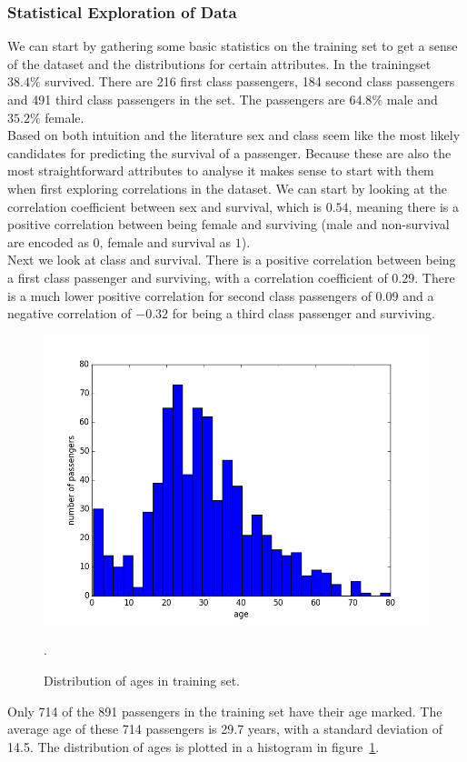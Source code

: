 \documentclass[english, a4paper]{article}
\begin{document}
\subsubsection{Statistical Exploration of Data}
We can start by gathering some basic statistics on the training set to get a sense of the dataset and the distributions for certain attributes. In the trainingset $38.4\%$ survived. There are 216 first class passengers, 184 second class passengers and 491 third class passengers in the set. The passengers are $64.8\%$ male and $35.2\%$ female.\\
Based on both intuition and the literature sex and class seem like the most likely candidates for predicting the survival of a passenger. Because these are also the most straightforward attributes to analyse it makes sense to start with them when first exploring correlations in the dataset. We can start by looking at the correlation coefficient between sex and survival, which is $0.54$, meaning there is a positive correlation between being female and surviving (male and non-survival are encoded as $0$, female and survival as $1$).\\
Next we look at class and survival. There is a positive correlation between being a first class passenger and surviving, with a correlation coefficient of $0.29$. There is a much lower positive correlation for second class passengers of $0.09$ and a negative correlation of $-0.32$ for being a third class passenger and surviving.
\begin{figure}[H]
    \includegraphics[width=0.8\linewidth]{age_distribution}
    \caption{Distribution of ages in training set.}
    \label{fig:age_histogram}.
\end{figure}
\noindent
Only 714 of the 891 passengers in the training set have their age marked. The average age of these 714 passengers is 29.7 years, with a standard deviation of 14.5. The distribution of ages is plotted in a histogram in figure~\ref{fig:age_histogram}.\\
\end{document}
